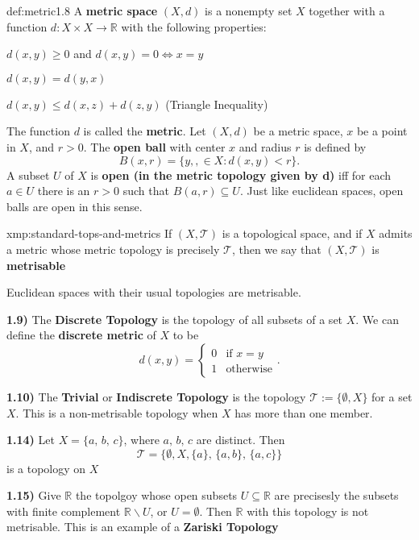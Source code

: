 \documentclass[landscape, 8pt]{extarticle}
\begin{document}
\begin{multicols}{3}
\begin{xmp}{def:metric}{1.8}
    A \textbf{metric space} $(X, d)$ is a nonempty set $X$ together with a function $d : X \times X \to \mathbb{R}$ with the following properties:
    \begin{enumerate-a-tight}
        \item $d(x,y)\ge 0$ and $d(x,y)=0 \iff x = y$
        \item $d(x,y)=d(y,x)$
        \item $d(x,y)\le d(x,z)+d(z,y)$ (Triangle Inequality)
    \end{enumerate-a-tight}
    The function $d$ is called the \textbf{metric}.
    \longrule{0.08ex}
    Let $(X, d)$ be a metric space, $x$ be a point in $X$, and $r > 0$. The \textbf{open ball} with center $x$ and radius $r$ is defined by
    \[B(x,r) = \{y,,\in X: d(x,y) < r\}.\]
    A subset $U$ of $X$ is \textbf{open (in the metric topology given by d)} iff for each $a\in U$ there is an $r > 0$ such that $B(a,r) \subseteq U$. Just like euclidean spaces, open balls are open in this sense.
\end{xmp}

\begin{xmp}{xmp:standard-tops-and-metrics}{}
    If $(X, \mathcal{T})$ is a topological space, and if $X$ admits a metric whose metric topology is precisely $\mathcal{T}$, then we say that $(X, \mathcal{T})$ is \textbf{metrisable}
    \begin{itemize-tight}
        \item Euclidean spaces with their usual topologies are metrisable.
        \item[\textbf{1.9)}] The \textbf{Discrete Topology} is the topology of all subsets of a set $X$. We can define the \textbf{discrete metric} of $X$ to be
            \[d(x, y) = \begin{cases}
                0 & \text{if } x = y \\
                1 & \text{otherwise}
            \end{cases}.\]
        \item[\textbf{1.10)}] The \textbf{Trivial} or \textbf{Indiscrete Topology} is the topology $\mathcal{T} := \{\emptyset, X\}$ for a set $X$. This is a non-metrisable topology when $X$ has more than one member.
        \item[\textbf{1.14)}] Let $X = \{a,\,b,\,c\}$, where $a,\,b,\,c$ are distinct. Then
            \[\mathcal{T} = \{\emptyset, X, \{a\},\,\{a,b\},\,\{a,c\}\}\]
            is a topology on $X$
        \item[\textbf{1.15)}] Give $\mathbb{R}$ the topolgoy whose open subsets $U \subseteq \mathbb{R}$ are precisesly the subsets with finite complement $\mathbb{R} \backslash U$, or $U = \emptyset$. Then $\mathbb{R}$ with this topology is not metrisable. This is an example of a \textbf{Zariski Topology}
    \end{itemize-tight}
\end{xmp}


\end{multicols}
\end{document}
